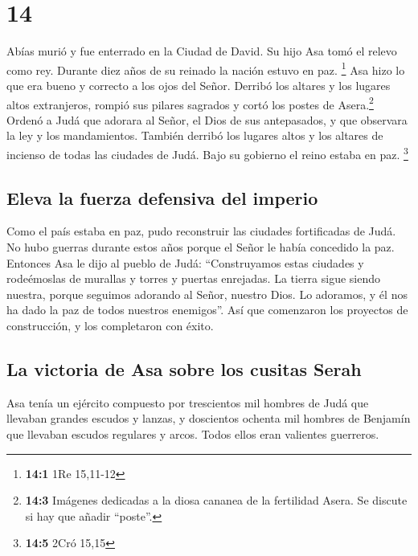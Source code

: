 \hypertarget{section-13}{%
\section{14}\label{section-13}}

 Abías murió y fue enterrado en la Ciudad de David. Su
hijo Asa tomó el relevo como rey. Durante diez años de su reinado la
nación estuvo en paz. \footnote{\textbf{14:1} 1Re 15,11-12}
 Asa hizo lo que era bueno y correcto a los ojos del
Señor.  Derribó los altares y los lugares altos
extranjeros, rompió sus pilares sagrados y cortó los postes de
Asera.\footnote{\textbf{14:3} Imágenes dedicadas a la diosa cananea de
  la fertilidad Asera. Se discute si hay que añadir ``poste''.}
 Ordenó a Judá que adorara al Señor, el Dios de sus
antepasados, y que observara la ley y los mandamientos. 
También derribó los lugares altos y los altares de incienso de todas las
ciudades de Judá. Bajo su gobierno el reino estaba en paz. \footnote{\textbf{14:5}
  2Cró 15,15}

\hypertarget{eleva-la-fuerza-defensiva-del-imperio}{%
\subsection{Eleva la fuerza defensiva del
imperio}\label{eleva-la-fuerza-defensiva-del-imperio}}

 Como el país estaba en paz, pudo reconstruir las ciudades
fortificadas de Judá. No hubo guerras durante estos años porque el Señor
le había concedido la paz.  Entonces Asa le dijo al pueblo
de Judá: ``Construyamos estas ciudades y rodeémoslas de murallas y
torres y puertas enrejadas. La tierra sigue siendo nuestra, porque
seguimos adorando al Señor, nuestro Dios. Lo adoramos, y él nos ha dado
la paz de todos nuestros enemigos''. Así que comenzaron los proyectos de
construcción, y los completaron con éxito.

\hypertarget{la-victoria-de-asa-sobre-los-cusitas-serah}{%
\subsection{La victoria de Asa sobre los cusitas
Serah}\label{la-victoria-de-asa-sobre-los-cusitas-serah}}

 Asa tenía un ejército compuesto por trescientos mil
hombres de Judá que llevaban grandes escudos y lanzas, y doscientos
ochenta mil hombres de Benjamín que llevaban escudos regulares y arcos.
Todos ellos eran valientes guerreros.

